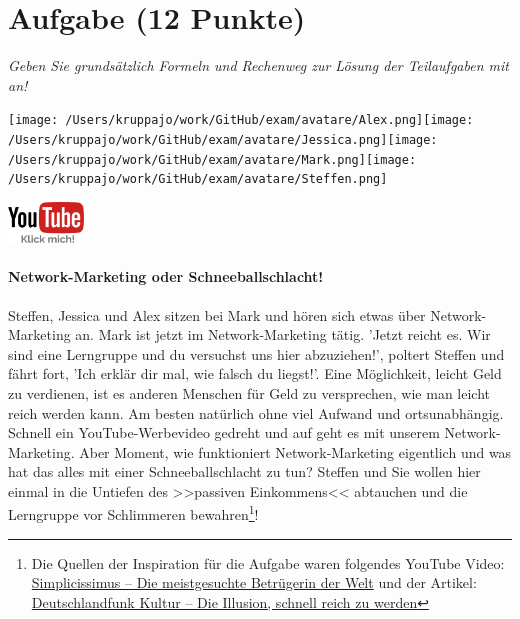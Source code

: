 \documentclass[a4paper, 9pt]{scrartcl}\usepackage[]{graphicx}\usepackage[]{xcolor}
\begin{document}
 
\clearpage

\section{Aufgabe \hfill (12 Punkte)}

\textit{Geben Sie grundsätzlich Formeln und Rechenweg zur Lösung der Teilaufgaben mit an!} \\[1Ex]
 

 
\begin{minipage}[t]{0.5\textwidth}
\texttt{[image: /Users/kruppajo/work/GitHub/exam/avatare/Alex.png]}\hspace{-4mm}\texttt{[image: /Users/kruppajo/work/GitHub/exam/avatare/Jessica.png]}\hspace{-4mm}\texttt{[image: /Users/kruppajo/work/GitHub/exam/avatare/Mark.png]}\hspace{-4mm}\texttt{[image: /Users/kruppajo/work/GitHub/exam/avatare/Steffen.png]}
\end{minipage}
\begin{minipage}[t]{0.5\textwidth}
\hfill
\href{https://youtu.be/SZqp_vy3rgI}{\includegraphics[width = 2cm]{img/youtube}}
\end{minipage}



\paragraph{Network-Marketing oder Schneeballschlacht!}



Steffen, Jessica und Alex sitzen bei Mark und hören sich etwas über Network-Marketing an. Mark ist jetzt im Network-Marketing tätig. 'Jetzt reicht es. Wir sind eine Lerngruppe und du versuchst uns hier abzuziehen!', poltert Steffen und fährt fort, 'Ich erklär dir mal, wie falsch du liegst!'. Eine Möglichkeit, leicht Geld zu verdienen, ist es anderen Menschen für Geld zu versprechen, wie man leicht reich werden kann. Am besten natürlich ohne viel Aufwand und ortsunabhängig. Schnell ein YouTube-Werbevideo gedreht und auf geht es mit unserem Network-Marketing. Aber Moment, wie funktioniert Network-Marketing eigentlich und was hat das alles mit einer Schneeballschlacht zu tun? Steffen und Sie wollen hier einmal in die Untiefen des >>passiven Einkommens<< abtauchen und die Lerngruppe vor Schlimmeren bewahren\footnote{Die Quellen der Inspiration für die Aufgabe waren folgendes YouTube Video: \href{https://youtu.be/UOKkZF_qK9M?si=uf4foJVFKfeQMwSw}{Simplicissimus -- Die meistgesuchte Betrügerin der Welt} und der Artikel: \href{https://www.deutschlandfunkkultur.de/netzwerk-marketing-die-illusion-schnell-reich-zu-werden-100.html}{Deutschlandfunk Kultur -- Die Illusion, schnell reich zu werden}}!\\
\end{document}
